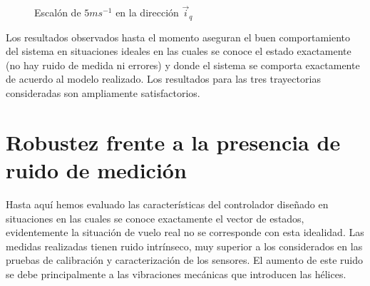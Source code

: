 \documentclass[main]{subfiles}
\begin{document}
\begin{figure}
  \centering
 
  \caption{Escal\'on de $5m s^{-1}$ en la direcci\'on $\vec{i}_q$}
  \label{fig:rec_esc_x}
\end{figure}

Los resultados observados hasta el momento aseguran el buen comportamiento del sistema en situaciones ideales en las cuales se conoce el estado exactamente (no hay ruido de medida ni errores) y donde el sistema se comporta exactamente de acuerdo al modelo realizado. Los resultados para las tres trayectorias consideradas son ampliamente satisfactorios.\\

\section{Robustez frente a la presencia de ruido de medici\'on}

Hasta aqu\'i hemos evaluado las caracter\'isticas del controlador diseñado en situaciones en las cuales se conoce exactamente el vector de estados, evidentemente la situaci\'on de vuelo real no se corresponde con esta idealidad. Las medidas realizadas tienen ruido intr\'inseco, muy superior a los considerados en las pruebas de calibraci\'on y caracterizaci\'on de los sensores. El aumento de este ruido se debe principalmente a las vibraciones mec\'anicas que introducen las h\'elices.\\
\end{document}
